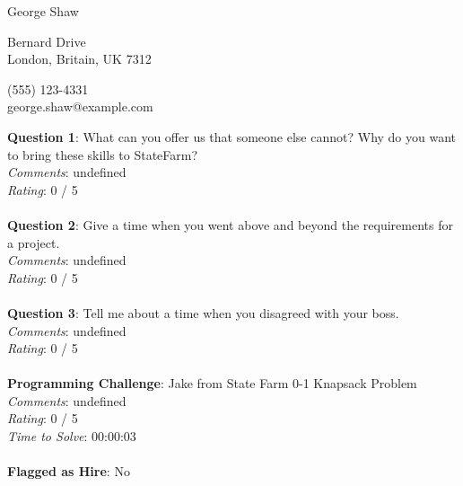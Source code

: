 \documentclass[12pt]{article}
\begin{document}
{\LARGE \begin{center}George Shaw\end{center}}

\begin{multicols}{2}
 Bernard Drive \\
London, Britain, UK 7312
\columnbreak

\noindent
(555) 123-4331 \\
george.shaw@example.com
\end{multicols}

\noindent
\textbf{Question 1}: What can you offer us that someone else cannot? Why do you want to bring these skills to StateFarm?
\\\noindent
\textit{Comments}: undefined
\\\noindent
\textit{Rating}: 0 / 5
\\\\
\noindent
\textbf{Question 2}: Give a time when you went above and beyond the requirements for a project.
\\\noindent
\textit{Comments}: undefined
\\\noindent
\textit{Rating}: 0 / 5
\\\\
\noindent
\textbf{Question 3}: Tell me about a time when you disagreed with your boss.
\\\noindent
\textit{Comments}: undefined
\\\noindent
\textit{Rating}: 0 / 5
\\\\
\noindent
\textbf{Programming Challenge}: Jake from State Farm 0-1 Knapsack Problem
\\\noindent
\textit{Comments}: undefined
\\\noindent
\textit{Rating}: 0 / 5
\\\noindent
\textit{Time to Solve}: 00:00:03
\\\\
\textbf{Flagged as Hire}: No
\\\\ 
\end{document}
